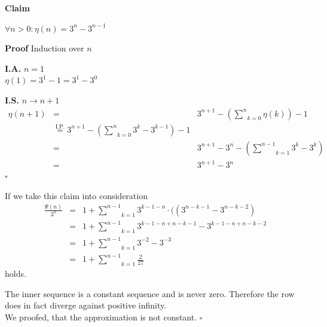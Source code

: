 \documentclass[11pt,a4paper,ngerman]{article}
\newcommand{\claim}{\addtocounter{claims}{1} \bfseries Claim \arabic{claims}}
\newcommand{\proof}{\bfseries Proof}
\begin{document}
\begin{description}
\begin{description}
	\item{\claim} $\forall n > 0 : \eta (n) = 3^n - 3^{n-1}$
	\item{\proof} Induction over $n$\\
	\begin{description}
		\item{\bfseries I.A.} $n=1$\\
			$\eta (1) = 3^1 - 1 = 3^1 - 3^0$
		\item{\bfseries I.S.} $n \rightarrow n+1$\\
			$$
				\begin{array}{rcl}
					\eta(n+1) &=& 3^{n+1} - \left( \underset{k=0}{\overset{n}{\sum}} \eta (k) \right) - 1\\
						&\overset{\text{I.P.}}{=} 3^{n+1} -  \left( \underset{k=0}{\overset{n}{\sum}} 3^k - 3^{k-1} \right) - 1\\
						&=& 3^{n+1} - 3^n - \left( \underset{k=1}{\overset{n-1}{\sum}} 3^k - 3^k \right)\\
						&=& 3^{n+1} - 3^n
				\end{array}
			$$
\mbox{}\hfill $\square$
	\end{description}
\end{description}

If we take this claim into consideration
$$
\begin{array}{rcl}
\frac{\Psi(n)}{3^n} &=& 1 + \underset{k=1}{\overset{n-1}{\sum}} 3^{k - 1 - n} \cdot ( (3^{n-k-1} - 3^{n-k-2})\\
	&=& 1 + \underset{k=1}{\overset{n-1}{\sum}} 3^{k-1-n + n - k -1} - 3^{k - 1 - n + n - k -2}\\
	&=& 1 + \underset{k=1}{\overset{n-1}{\sum}} 3^{-2} - 3^{-3}\\
	&=& 1 + \underset{k=1}{\overset{n-1}{\sum}} \frac{2}{27}
\end{array}
$$
holds.

The inner sequence is a constant sequence and is never zero. Therefore the row does in fact diverge against positive infinity.\\

We proofed, that the approximation is not constant. \mbox{} \hfill $\square$

\end{description}



\end{document}
